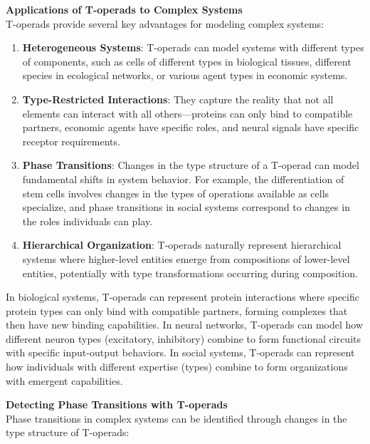 \textbf{Applications of T-operads to Complex Systems}
\\

T-operads provide several key advantages for modeling complex systems:

\begin{enumerate}
  \item \textbf{Heterogeneous Systems}: T-operads can model systems with different types of components, such as cells of different types in biological tissues, different species in ecological networks, or various agent types in economic systems.

  \item \textbf{Type-Restricted Interactions}: They capture the reality that not all elements can interact with all others—proteins can only bind to compatible partners, economic agents have specific roles, and neural signals have specific receptor requirements.

  \item \textbf{Phase Transitions}: Changes in the type structure of a T-operad can model fundamental shifts in system behavior. For example, the differentiation of stem cells involves changes in the types of operations available as cells specialize, and phase transitions in social systems correspond to changes in the roles individuals can play.

  \item \textbf{Hierarchical Organization}: T-operads naturally represent hierarchical systems where higher-level entities emerge from compositions of lower-level entities, potentially with type transformations occurring during composition.
\end{enumerate}

In biological systems, T-operads can represent protein interactions where specific protein types can only bind with compatible partners, forming complexes that then have new binding capabilities. In neural networks, T-operads can model how different neuron types (excitatory, inhibitory) combine to form functional circuits with specific input-output behaviors. In social systems, T-operads can represent how individuals with different expertise (types) combine to form organizations with emergent capabilities.

\textbf{Detecting Phase Transitions with T-operads}
\\

Phase transitions in complex systems can be identified through changes in the type structure of T-operads:

